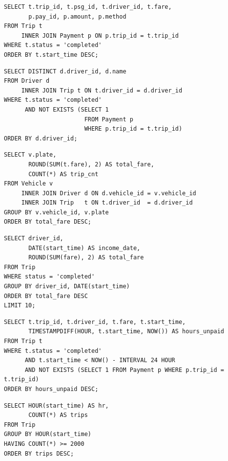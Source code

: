 \begin{lstlisting}[caption={Q1: completed trips with payment.}]
SELECT t.trip_id, t.psg_id, t.driver_id, t.fare,
       p.pay_id, p.amount, p.method
FROM Trip t
     INNER JOIN Payment p ON p.trip_id = t.trip_id
WHERE t.status = 'completed'
ORDER BY t.start_time DESC;
\end{lstlisting}

\begin{lstlisting}[caption={Q2: completed but unpaid drivers.}]
SELECT DISTINCT d.driver_id, d.name
FROM Driver d
     INNER JOIN Trip t ON t.driver_id = d.driver_id
WHERE t.status = 'completed'
      AND NOT EXISTS (SELECT 1
                       FROM Payment p
                       WHERE p.trip_id = t.trip_id)
ORDER BY d.driver_id;
\end{lstlisting}

\begin{lstlisting}[caption={Q3: total fare per vehicle.}]
SELECT v.plate,
       ROUND(SUM(t.fare), 2) AS total_fare,
       COUNT(*) AS trip_cnt
FROM Vehicle v
     INNER JOIN Driver d ON d.vehicle_id = v.vehicle_id
     INNER JOIN Trip   t ON t.driver_id  = d.driver_id
GROUP BY v.vehicle_id, v.plate
ORDER BY total_fare DESC;
\end{lstlisting}

\begin{lstlisting}[caption={Q4: driver daily income ranking.}]
SELECT driver_id,
       DATE(start_time) AS income_date,
       ROUND(SUM(fare), 2) AS total_fare
FROM Trip
WHERE status = 'completed'
GROUP BY driver_id, DATE(start_time)
ORDER BY total_fare DESC
LIMIT 10;
\end{lstlisting}

\begin{lstlisting}[caption={Q5: unpaid $>$24h.}]
SELECT t.trip_id, t.driver_id, t.fare, t.start_time,
       TIMESTAMPDIFF(HOUR, t.start_time, NOW()) AS hours_unpaid
FROM Trip t
WHERE t.status = 'completed'
      AND t.start_time < NOW() - INTERVAL 24 HOUR
      AND NOT EXISTS (SELECT 1 FROM Payment p WHERE p.trip_id = t.trip_id)
ORDER BY hours_unpaid DESC;
\end{lstlisting}

\begin{lstlisting}[caption={Q6: peak-hour volume.}]
SELECT HOUR(start_time) AS hr,
       COUNT(*) AS trips
FROM Trip
GROUP BY HOUR(start_time)
HAVING COUNT(*) >= 2000
ORDER BY trips DESC;
\end{lstlisting}

